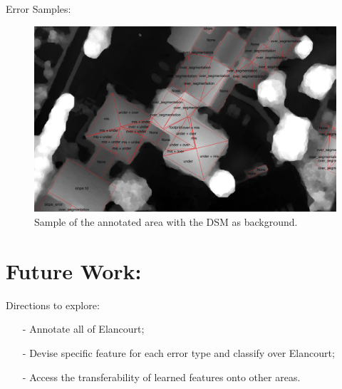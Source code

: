 \documentclass[9pt]{beamer}
\begin{document}
	\begin{frame}{Error Samples:}
		\begin{figure}
			\begin{center}
				\caption{\label{img::annotation} Sample of the annotated area with the DSM as background.}
				\includegraphics[scale=.25]{errors_sample.png}
			\end{center}
		\end{figure}
	\end{frame}

	\section[Future]{Future Work:}

	\begin{frame}{Directions to explore:}
		
		\begin{itemize}
			\item[-] Annotate all of Elancourt;
			\item[-] Devise specific feature for each error type and classify over Elancourt;
			\item[-] Access the transferability of learned features onto other areas.
		\end{itemize}
	\end{frame}
	
\end{document}
